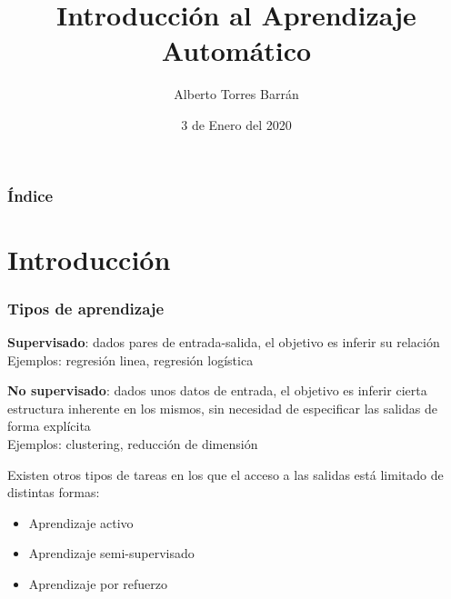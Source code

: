 \documentclass{beamer}
\title{Introducción al Aprendizaje Automático}
\author{Alberto Torres Barrán}
\date{3 de Enero del 2020}
\newenvironment{wideitemize}{\itemize\addtolength{\itemsep}{12pt}}{\enditemize}
\begin{document}
\begin{frame}[plain]
\titlepage
\end{frame}

\begin{frame}
	\frametitle{Índice}
    \tableofcontents
\end{frame}


\section{Introducción}

\begin{frame}
\frametitle{Tipos de aprendizaje}

\begin{wideitemize}
\item \textbf{Supervisado}: dados pares de entrada-salida, el objetivo es inferir su relación \\
Ejemplos: regresión linea, regresión logística 

\item \textbf{No supervisado}: dados unos datos de entrada, el objetivo es inferir cierta estructura inherente en los mismos, sin necesidad de especificar las salidas de forma explícita\\
Ejemplos: clustering, reducción de dimensión

\item Existen otros tipos de tareas en los que el acceso a las salidas está limitado de distintas formas:
\begin{itemize}
\item Aprendizaje activo
\item Aprendizaje semi-supervisado
\item Aprendizaje por refuerzo
\end{itemize}
\end{wideitemize}
\end{frame}
\end{document}

